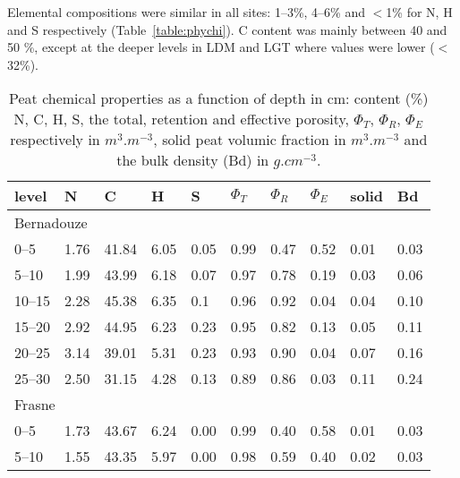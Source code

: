 Elemental compositions were similar in all sites: 1--3\%, 4--6\% and $<$1\% for N, H and S respectively (Table~\ref{table:phychi}).
C content was mainly between 40 and 50 \%, except at the deeper levels in LDM and LGT where values were lower ($<$ 32\%).

\begin{table}
\centering
\caption{Peat chemical properties as a function of depth in cm: content (\%) N, C, H, S, the total, retention and effective porosity, $\Phi_{T}$, $\Phi_{R}$, $\Phi_{E}$ respectively in $m^{3}.m^{-3}$, solid peat volumic fraction in $m^{3}.m^{-3}$ and the bulk density (Bd) in $g.cm^{-3}$.} 
\begin{tabular}{llllllllll}
\hline
level  & N & C & H & S & $\Phi_{T}$ & $\Phi_{R}$ & $\Phi_{E}$ & solid & Bd \\
\hline
\multicolumn{2}{l}{Bernadouze} & & & & & & & & \\[-1ex] 
0--5 & 1.76 & 41.84 & 6.05 & 0.05   & 0.99 & 0.47 & 0.52 & 0.01 & 0.03 \\[-1ex] 
5--10 & 1.99 & 43.99 & 6.18 & 0.07 & 0.97 & 0.78 & 0.19 & 0.03 & 0.06 \\[-1ex] 
10--15 & 2.28 & 45.38 & 6.35 & 0.1 & 0.96 & 0.92 & 0.04 & 0.04 & 0.10 \\[-1ex] 
15--20 & 2.92 & 44.95 & 6.23 & 0.23 & 0.95 & 0.82 & 0.13 & 0.05 & 0.11 \\[-1ex] 
20--25 & 3.14 & 39.01 & 5.31 & 0.23 & 0.93 & 0.90 & 0.04 & 0.07 & 0.16 \\[-1ex] 
25--30 & 2.50 & 31.15 & 4.28 & 0.13 & 0.89 & 0.86 & 0.03 & 0.11 & 0.24 \\
\multicolumn{2}{l}{Frasne} & & & &  & & & & \\[-1ex] 
0--5 & 1.73 & 43.67 & 6.24 & 0.00 & 0.99 & 0.40 & 0.58 & 0.01 & 0.03 \\[-1ex] 
5--10 & 1.55 & 43.35 & 5.97 & 0.00 & 0.98 & 0.59 & 0.40 & 0.02 & 0.03 \\[-1ex] 

\end{tabular}
\end{table}
